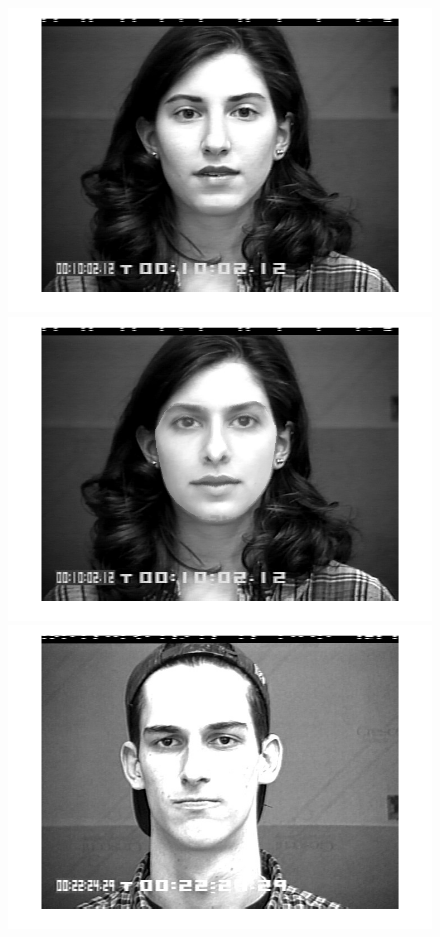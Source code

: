 \begin{figure}[!htb]
    	\includegraphics[scale=.10]{figure/77/05.png}
    	\includegraphics[scale=.10]{figure/77de/05.png}
    	\hspace{1cm}
    	\includegraphics[scale=.10]{figure/89/10.png}

\end{figure}
